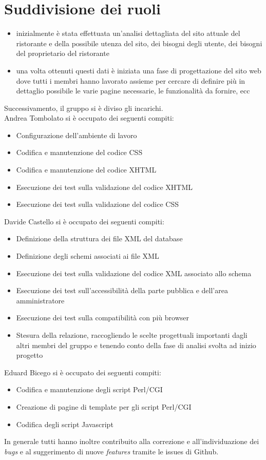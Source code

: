 \documentclass[../relazione.tex]{subfiles}
\begin{document}
\section{Suddivisione dei ruoli}
	\begin{itemize}
		\item inizialmente è stata effettuata un'analisi dettagliata del sito attuale del ristorante e della possibile utenza del sito, dei bisogni degli utente, dei bisogni del proprietario del ristorante
		\item una volta ottenuti questi dati è iniziata una fase di progettazione del sito web dove tutti i membri hanno lavorato assieme per cercare di definire più in dettaglio possibile le varie pagine necessarie, le funzionalità da fornire, ecc
	\end{itemize}
	Successivamento, il gruppo si è diviso gli incarichi.\\
	Andrea Tombolato si è occupato dei seguenti compiti:
	\begin{itemize}
		\item Configurazione dell’ambiente di lavoro
		\item Codifica e manutenzione del codice CSS
		\item Codifica e manutenzione del codice XHTML
		\item Esecuzione dei test sulla validazione del codice XHTML
		\item Esecuzione dei test sulla validazione del codice CSS
	\end{itemize}
	Davide Castello si è occupato dei seguenti compiti:
	\begin{itemize}
		\item Definizione della struttura dei file XML del database
		\item Definizione degli schemi associati ai file XML
		\item Esecuzione dei test sulla validazione del codice XML associato allo schema
		\item Esecuzione dei test sull’accessibilità della parte pubblica e dell'area amministratore
		\item Esecuzione dei test sulla compatibilità con più browser
		\item Stesura della relazione, raccogliendo le scelte progettuali importanti dagli altri membri del gruppo e tenendo conto della fase di analisi svolta ad inizio progetto
	\end{itemize}
	Eduard Bicego si è occupato dei seguenti compiti:
	\begin{itemize}
		\item Codifica e manutenzione degli script Perl/CGI
		\item Creazione di pagine di template per gli script Perl/CGI
		\item Codifica degli script Javascript
	\end{itemize}
	In generale tutti hanno inoltre contribuito alla correzione e all’individuazione dei \textit{bugs} e al suggerimento di nuove \textit{features} tramite le issues di Github.
\end{document}
